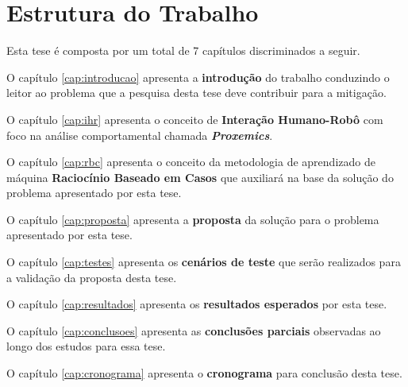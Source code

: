 \section{Estrutura do Trabalho}
Esta tese é composta por um total de 7 capítulos discriminados a seguir.

O capítulo \ref{cap:introducao} apresenta a \textbf{introdução} do trabalho conduzindo o leitor ao problema que a pesquisa desta tese deve contribuir para a mitigação. 

O capítulo \ref{cap:ihr} apresenta o conceito de \textbf{Interação Humano-Robô} com foco na análise comportamental chamada \emph{\textbf{Proxemics}}.

O capítulo \ref{cap:rbc} apresenta o conceito da metodologia de aprendizado de máquina \textbf{Raciocínio Baseado em Casos} que auxiliará na base da solução do problema apresentado por esta tese.

O capítulo \ref{cap:proposta} apresenta a \textbf{proposta} da solução para o problema apresentado por esta tese.

O capítulo \ref{cap:testes} apresenta os \textbf{cenários de teste} que serão realizados para a validação da proposta desta tese.

O capítulo \ref{cap:resultados} apresenta os \textbf{resultados esperados} por esta tese.

O capítulo \ref{cap:conclusoes} apresenta as \textbf{conclusões parciais} observadas ao longo dos estudos para essa tese.

O capítulo \ref{cap:cronograma} apresenta o \textbf{cronograma} para conclusão desta tese.